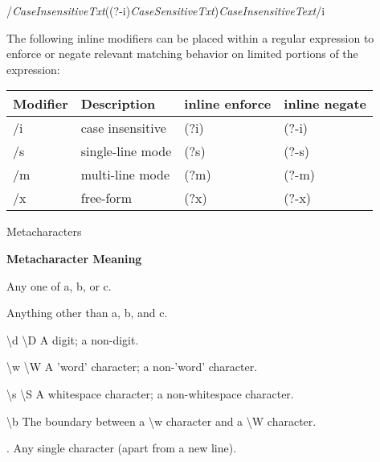 \documentclass[a4paper,11pt]{book}
\begin{document}
\noindent 

\noindent /\textit{CaseInsensitiveTxt}((?-i)\textit{CaseSensitiveTxt})\textit{CaseInsensitiveText}/i

\noindent 

\noindent The following inline modifiers can be placed within a regular expression to enforce or negate relevant matching behavior on limited portions of the expression:

\noindent 

\begin{tabular}{|p{1.3in}|p{0.9in}|p{0.8in}|p{0.7in}|} \hline 
\textbf{Modifier} & \textbf{Description} & \textbf{inline enforce} & \textbf{inline negate} \\ \hline 
/i & case insensitive & (?i) & (?-i) \\ \hline 
/s & single-line mode & (?s) & (?-s) \\ \hline 
/m & multi-line mode & (?m) & (?-m) \\ \hline 
/x & free-form & (?x) & (?-x) \\ \hline 
\end{tabular}

\eject 

\noindent 

\noindent Metacharacters

\noindent 

\noindent \textbf{Metacharacter Meaning}

\noindent 

\noindent [abc] Any one of a, b, or c.

\noindent 

\noindent [\^{}abc] Anything other than a, b, and c.

\noindent 

\noindent \textbackslash d \textbackslash D A digit; a non-digit.

\noindent 

\noindent \textbackslash w \textbackslash W A 'word' character; a non-'word' character.

\noindent 

\noindent \textbackslash s \textbackslash S A whitespace character; a non-whitespace character.

\noindent 

\noindent \textbackslash b The boundary between a \textbackslash w character and a \textbackslash W character.

\noindent 

\noindent . Any single character (apart from a new line).
\end{document}
